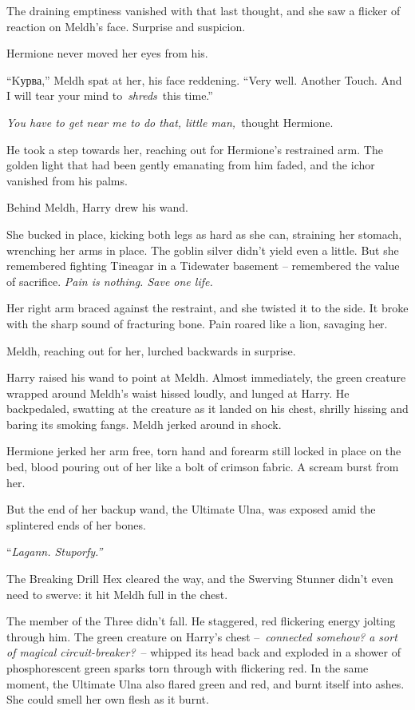The draining emptiness vanished with that last thought, and she saw a
flicker of reaction on Meldh's face. Surprise and suspicion.

Hermione never moved her eyes from his.

``\foreignlanguage{greek}{\textgreek{Kурва}},'' Meldh spat at her, his
face reddening. ``Very well. Another Touch. And I will tear your mind
to~\emph{shreds}~this time.''

\emph{You have to get near me to do that, little man,}~thought Hermione.

He took a step towards her, reaching out for Hermione's restrained arm.
The golden light that had been gently emanating from him faded, and the
ichor vanished from his palms.

Behind Meldh, Harry drew his wand.

She bucked in place, kicking both legs as hard as she can, straining her
stomach, wrenching her arms in place. The goblin silver didn't yield
even a little. But she remembered fighting Tineagar in a Tidewater
basement -- remembered the value of sacrifice. \emph{Pain is nothing.
Save one life.}

Her right arm braced against the restraint, and she twisted it to the
side. It broke with the sharp sound of fracturing bone. Pain roared like
a lion, savaging her.

Meldh, reaching out for her, lurched backwards in surprise.

Harry raised his wand to point at Meldh. Almost immediately, the green
creature wrapped around Meldh's waist hissed loudly, and lunged at
Harry. He backpedaled, swatting at the creature as it landed on his
chest, shrilly hissing and baring its smoking fangs. Meldh jerked around
in shock.

Hermione jerked her arm free, torn hand and forearm still locked in
place on the bed, blood pouring out of her like a bolt of crimson
fabric. A scream burst from her.

But the end of her backup wand, the Ultimate Ulna, was exposed amid the
splintered ends of her bones.

``\emph{Lagann. Stuporfy.''}

The Breaking Drill Hex cleared the way, and the Swerving Stunner didn't
even need to swerve: it hit Meldh full in the chest.

The member of the Three didn't fall. He staggered, red flickering energy
jolting through him. The green creature on Harry's chest
--~\emph{connected somehow? a sort of magical circuit-breaker?}~--
whipped its head back and exploded in a shower of phosphorescent green
sparks torn through with flickering red. In the same moment, the
Ultimate Ulna also flared green and red, and burnt itself into ashes.
She could smell her own flesh as it burnt.

